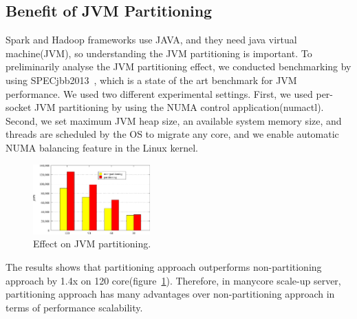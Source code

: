 \fi



\subsection{Benefit of JVM Partitioning}


Spark and Hadoop frameworks use JAVA, and they need java virtual machine(JVM), so
understanding the JVM partitioning is important.
To preliminarily analyse the JVM partitioning effect, we conducted
benchmarking by using SPECjbb2013~\cite{Pogue2014SO}, which is a state of the art
benchmark for JVM performance.
We used two different experimental settings. 
First, we used per-socket JVM partitioning by using the NUMA control application(numactl).
Second, we set maximum JVM heap size, an available system
memory size, and threads are scheduled by the OS to
migrate any core, and we enable automatic NUMA
balancing feature in the Linux kernel.

\begin{figure}[h]
  \begin{center}
     \includegraphics[width=0.4\textwidth]{graph/SPECjbb2013}
  \end{center}
  \caption{Effect on JVM partitioning.}
  \label{fig:SPECJBB}
\end{figure}

The results shows that partitioning approach outperforms non-partitioning approach
by 1.4x on 120 core(figure~\ref{fig:SPECJBB}).
Therefore, in manycore scale-up server, partitioning approach has many
advantages over non-partitioning approach in terms of performance scalability.

